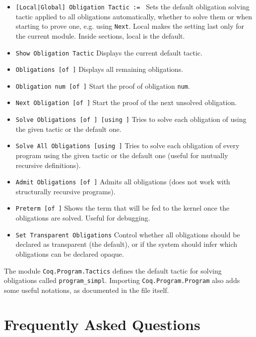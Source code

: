 \begin{itemize}
\item {\tt [Local|Global] Obligation Tactic := \tacexpr}
  Sets the default obligation
  solving tactic applied to all obligations automatically, whether to
  solve them or when starting to prove one, e.g. using {\tt Next}.
  Local makes the setting last only for the current module. Inside
  sections, local is the default.
\item {\tt Show Obligation Tactic}
  Displays the current default tactic.
\item {\tt Obligations [of \ident]} Displays all remaining
  obligations.
\item {\tt Obligation num [of \ident]} Start the proof of
  obligation {\tt num}.
\item {\tt Next Obligation [of \ident]} Start the proof of the next
  unsolved obligation.
\item {\tt Solve Obligations [of \ident] [using
    \tacexpr]}
  Tries to solve
  each obligation of \ident using the given tactic or the default one.
\item {\tt Solve All Obligations [using \tacexpr]} Tries to solve
  each obligation of every program using the given tactic or the default
  one (useful for mutually recursive definitions).
\item {\tt Admit Obligations [of \ident]} 
  Admits all obligations (does not work with structurally recursive programs).
\item {\tt Preterm [of \ident]} 
  Shows the term that will be fed to
  the kernel once the obligations are solved. Useful for debugging.
\item {\tt Set Transparent Obligations}
  Control whether all obligations should be declared as transparent (the
  default), or if the system should infer which obligations can be declared opaque. 
\end{itemize}

The module {\tt Coq.Program.Tactics} defines the default tactic for solving
obligations called {\tt program\_simpl}. Importing 
{\tt Coq.Program.Program} also adds some useful notations, as documented in the file itself.

\section{Frequently Asked Questions
  \label{ProgramFAQ}}

